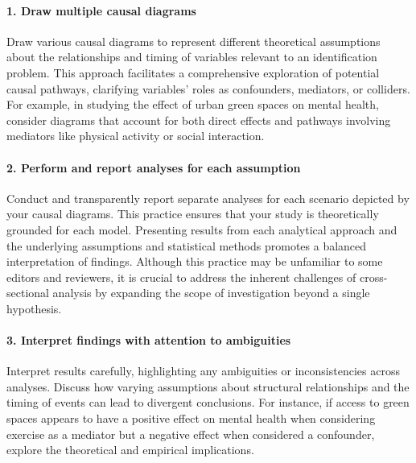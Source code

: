 \documentclass[
  singlecolumn]{article}
\let\oldparagraph\paragraph
\renewcommand{\paragraph}[1]{\oldparagraph{#1}\mbox{}}
\begin{document}
\paragraph{\texorpdfstring{1. \textbf{Draw multiple causal
diagrams}}{1. Draw multiple causal diagrams}}\label{draw-multiple-causal-diagrams}

Draw various causal diagrams to represent different theoretical
assumptions about the relationships and timing of variables relevant to
an identification problem. This approach facilitates a comprehensive
exploration of potential causal pathways, clarifying variables' roles as
confounders, mediators, or colliders. For example, in studying the
effect of urban green spaces on mental health, consider diagrams that
account for both direct effects and pathways involving mediators like
physical activity or social interaction.

\paragraph{\texorpdfstring{2. \textbf{Perform and report analyses for
each
assumption}}{2. Perform and report analyses for each assumption}}\label{perform-and-report-analyses-for-each-assumption}

Conduct and transparently report separate analyses for each scenario
depicted by your causal diagrams. This practice ensures that your study
is theoretically grounded for each model. Presenting results from each
analytical approach and the underlying assumptions and statistical
methods promotes a balanced interpretation of findings. Although this
practice may be unfamiliar to some editors and reviewers, it is crucial
to address the inherent challenges of cross-sectional analysis by
expanding the scope of investigation beyond a single hypothesis.

\paragraph{\texorpdfstring{3. \textbf{Interpret findings with attention
to
ambiguities}}{3. Interpret findings with attention to ambiguities}}\label{interpret-findings-with-attention-to-ambiguities}

Interpret results carefully, highlighting any ambiguities or
inconsistencies across analyses. Discuss how varying assumptions about
structural relationships and the timing of events can lead to divergent
conclusions. For instance, if access to green spaces appears to have a
positive effect on mental health when considering exercise as a mediator
but a negative effect when considered a confounder, explore the
theoretical and empirical implications.
\end{document}

